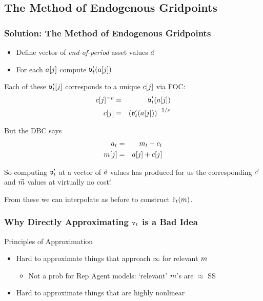 \documentclass{beamer}
\begin{document}

\subsection{The Method of Endogenous Gridpoints}
\begin{frame}
\frametitle{Solution: The Method of Endogenous Gridpoints}

\pause 

\begin{itemize}
\item Define vector of {\it end-of-period} asset values $\vec{a}$
\item For each $a[j]$ compute $\mathfrak{v}_{t}^{\prime}(a[j])$
\end{itemize}

\pause 

Each of these $\mathfrak{v}_{t}^{\prime}[j]$ corresponds to a unique
$c[j]$ via FOC:
\begin{eqnarray}
  c[j]^{-\rho} & = & \mathfrak{v}_{t}^{\prime}(a[j])
\\ c[j] & = & \left(\mathfrak{v}_{t}^{\prime}(a[j])\right)^{-1/\rho}
\end{eqnarray}

\pause 

But the DBC says
\begin{eqnarray}
  a_{t} & = & m_{t} - c_{t}
\\ m[j] & = & a[j]+c[j]
\end{eqnarray}

\pause 
So computing $\mathfrak{v}_{t}^{\prime}$ at a vector of $\vec{a}$ values has produced for us the corresponding $\vec{c}$ and $\vec{m}$ 
values at virtually no cost!  

\pause 
\medskip 
From these we can interpolate as before to construct $\grave{\mathrm{c}}_{t}(m)$.

\end{frame}


\begin{frame}
\frametitle{Why Directly Approximating $\mathrm{v}_{t}$ is a Bad Idea}

Principles of Approximation

\begin{itemize}
\item Hard to approximate things that approach $\infty$ for relevant $m$
\begin{itemize}
\item Not a prob for Rep Agent models: `relevant' $m$'s are $\approx$ SS
\end{itemize}
\item Hard to approximate things that are highly nonlinear 
\end{itemize}


\end{frame}
\end{document}
